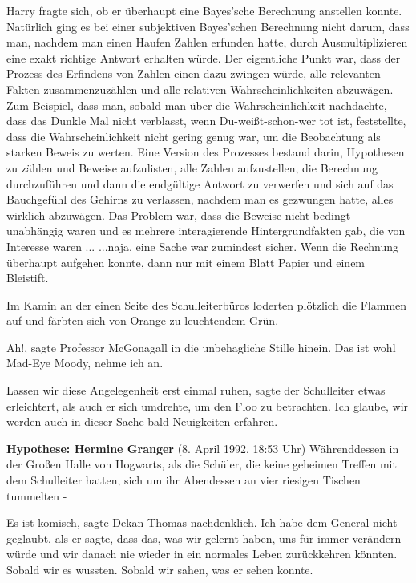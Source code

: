 Harry fragte sich, ob er überhaupt eine Bayes'sche Berechnung anstellen konnte.
Natürlich ging es bei einer subjektiven Bayes'schen Berechnung nicht darum, dass
man, nachdem man einen Haufen Zahlen erfunden hatte, durch Ausmultiplizieren
eine exakt richtige Antwort erhalten würde. Der eigentliche Punkt war, dass der
Prozess des Erfindens von Zahlen einen dazu zwingen würde, alle relevanten
Fakten zusammenzuzählen und alle relativen Wahrscheinlichkeiten abzuwägen. Zum
Beispiel, dass man, sobald man über die Wahrscheinlichkeit nachdachte, dass das
Dunkle Mal nicht verblasst, wenn Du-weißt-schon-wer tot ist, feststellte, dass
die Wahrscheinlichkeit nicht gering genug war, um die Beobachtung als starken
Beweis zu werten. Eine Version des Prozesses bestand darin, Hypothesen zu zählen
und Beweise aufzulisten, alle Zahlen aufzustellen, die Berechnung durchzuführen
und dann die endgültige Antwort zu verwerfen und sich auf das Bauchgefühl des
Gehirns zu verlassen, nachdem man es gezwungen hatte, alles wirklich abzuwägen.
Das Problem war, dass die Beweise nicht bedingt unabhängig waren und es mehrere
interagierende Hintergrundfakten gab, die von Interesse waren ... ...naja, eine
Sache war zumindest sicher. Wenn die Rechnung überhaupt aufgehen konnte, dann
nur mit einem Blatt Papier und einem Bleistift.

Im Kamin an der einen Seite des Schulleiterbüros loderten plötzlich die Flammen
auf und färbten sich von Orange zu leuchtendem Grün.

\glqq{}Ah!\grqq{}, sagte Professor McGonagall in die unbehagliche Stille hinein.
\glqq{}Das ist wohl Mad-Eye Moody, nehme ich an.\grqq{}

\glqq{}Lassen wir diese Angelegenheit erst einmal ruhen\grqq{}, sagte der
Schulleiter etwas erleichtert, als auch er sich umdrehte, um den Floo zu
betrachten. \glqq{}Ich glaube, wir werden auch in dieser Sache bald Neuigkeiten
erfahren.\grqq{}

\textbf{Hypothese: Hermine Granger} (8. April 1992, 18:53 Uhr) Währenddessen in
der Großen Halle von Hogwarts, als die Schüler, die keine geheimen Treffen mit
dem Schulleiter hatten, sich um ihr Abendessen an vier riesigen Tischen
tummelten -

\glqq{}Es ist komisch\grqq{}, sagte Dekan Thomas nachdenklich. \glqq{}Ich habe dem
General nicht geglaubt, als er sagte, dass das, was wir gelernt haben, uns für
immer verändern würde und wir danach nie wieder in ein normales Leben
zurückkehren könnten. Sobald wir es wussten. Sobald wir sahen, was er sehen
konnte.\grqq{}

